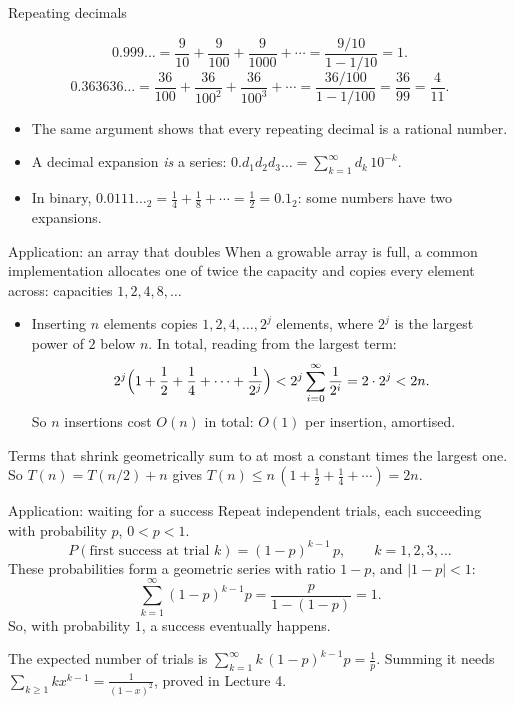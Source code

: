 \documentclass[10pt]{wosm-slides}
\begin{document}
\begin{frame}{Repeating decimals}
  \begin{example}
    \[ 0.999\ldots = \frac{9}{10} + \frac{9}{100} + \frac{9}{1000} + \cdots
       = \frac{9/10}{1 - 1/10} = 1 . \]
    \pause
    \[ 0.363636\ldots = \frac{36}{100} + \frac{36}{100^2} + \frac{36}{100^3} + \cdots
       = \frac{36/100}{1 - 1/100} = \frac{36}{99} = \frac{4}{11} . \]
  \end{example}
  \pause
  \begin{itemize}
    \item The same argument shows that every repeating decimal is a rational number.
    \item A decimal expansion \emph{is} a series:
      $0.d_1 d_2 d_3\ldots = \sum_{k=1}^\infty d_k\,10^{-k}$.
    \item In binary, $0.0111\ldots_2 = \frac14 + \frac18 + \cdots = \frac12 = 0.1_2$:
      some numbers have two expansions.
  \end{itemize}
\end{frame}

\begin{frame}{Application: an array that doubles}
  When a growable array is full, a common implementation allocates one of twice the
  capacity and copies every element across: capacities $1, 2, 4, 8, \dots$
  \begin{itemize}
    \item Inserting $n$ elements copies $1, 2, 4, \dots, 2^j$ elements, where $2^j$ is the
      largest power of $2$ below $n$. In total, reading from the largest term:
      \[ 2^j \Bigl(1 + \frac12 + \frac14 + \dots + \frac1{2^j}\Bigr)
         < 2^j \sum_{i=0}^{\infty} \frac{1}{2^i} = 2 \cdot 2^j < 2n . \]
      So $n$ insertions cost $O(n)$ in total: $O(1)$ per insertion, amortised.
  \end{itemize}
  \pause
  \begin{remark}
    Terms that shrink geometrically sum to at most a constant times the largest one.
    So $T(n) = T(n/2) + n$ gives $T(n) \le n\,(1 + \frac12 + \frac14 + \cdots) = 2n$.
  \end{remark}
\end{frame}

\begin{frame}{Application: waiting for a success}
  Repeat independent trials, each succeeding with probability $p$, $0 < p < 1$.
  \[ P(\text{first success at trial } k) = (1-p)^{k-1}\, p , \qquad k = 1, 2, 3, \dots \]
  \pause
  These probabilities form a geometric series with ratio $1 - p$, and $|1-p| < 1$:
  \[ \sum_{k=1}^{\infty} (1-p)^{k-1} p = \frac{p}{1 - (1-p)} = 1 . \]
  So, with probability $1$, a success eventually happens.
  \pause
  \begin{remark}
    The expected number of trials is $\sum_{k=1}^\infty k\,(1-p)^{k-1} p = \frac1p$.
    Summing it needs $\sum_{k \ge 1} k x^{k-1} = \frac{1}{(1-x)^2}$, proved in Lecture 4.
  \end{remark}
\end{frame}
\end{document}
